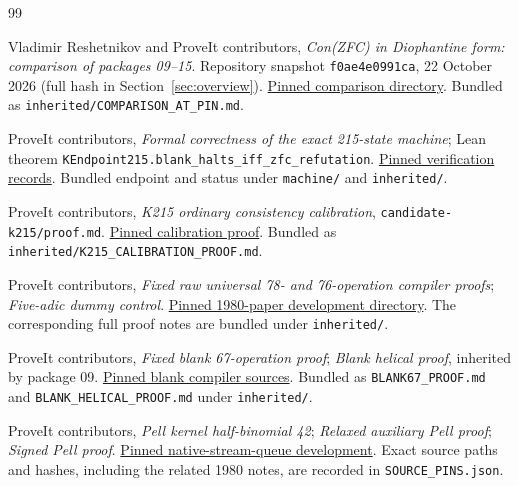 \begin{thebibliography}{99}

Vladimir Reshetnikov and ProveIt contributors,
\emph{Con(ZFC) in Diophantine form: comparison of packages 09--15}.
Repository snapshot \texttt{f0ae4e0991ca}, 22 October 2026
(full hash in Section~\ref{sec:overview}).
\href{https://github.com/VladimirReshetnikov/ProveIt/tree/f0ae4e0991ca44a7bb4e5671d42e33d775e48035/SetTheory/Cardinals/docs/reports/hilbert-tenth-problem/con-zfc-diophantine-forms}{Pinned comparison directory}.
Bundled as \texttt{inherited/COMPARISON\_AT\_PIN.md}.

ProveIt contributors, \emph{Formal correctness of the exact 215-state
machine}; Lean theorem
\texttt{KEndpoint215.blank\_halts\_iff\_zfc\_refutation}.
\href{https://github.com/VladimirReshetnikov/ProveIt/tree/f0ae4e0991ca44a7bb4e5671d42e33d775e48035/Computability/BusyBeaver/Research/ZFC/k225-formal/verification/k215}{Pinned verification records}.
Bundled endpoint and status under \texttt{machine/} and \texttt{inherited/}.

ProveIt contributors, \emph{K215 ordinary consistency calibration},
\texttt{candidate-k215/proof.md}.
\href{https://github.com/VladimirReshetnikov/ProveIt/blob/f0ae4e0991ca44a7bb4e5671d42e33d775e48035/Computability/BusyBeaver/Research/ZFC/candidate-k215/proof.md}{Pinned calibration proof}.
Bundled as \texttt{inherited/K215\_CALIBRATION\_PROOF.md}.

ProveIt contributors, \emph{Fixed raw universal 78- and 76-operation
compiler proofs}; \emph{Five-adic dummy control}.
\href{https://github.com/VladimirReshetnikov/ProveIt/tree/f0ae4e0991ca44a7bb4e5671d42e33d775e48035/Computability/HilbertTenthProblem/Papers/1980}{Pinned 1980-paper development directory}.
The corresponding full proof notes are bundled under \texttt{inherited/}.

ProveIt contributors, \emph{Fixed blank 67-operation proof};
\emph{Blank helical proof}, inherited by package 09.
\href{https://github.com/VladimirReshetnikov/ProveIt/tree/f0ae4e0991ca44a7bb4e5671d42e33d775e48035/SetTheory/Cardinals/docs/reports/hilbert-tenth-problem/con-zfc-diophantine-forms/09-combined13/upstream/compiler}{Pinned blank compiler sources}.
Bundled as \texttt{BLANK67\_PROOF.md} and
\texttt{BLANK\_HELICAL\_PROOF.md} under \texttt{inherited/}.

ProveIt contributors, \emph{Pell kernel half-binomial 42};
\emph{Relaxed auxiliary Pell proof}; \emph{Signed Pell proof}.
\href{https://github.com/VladimirReshetnikov/ProveIt/tree/f0ae4e0991ca44a7bb4e5671d42e33d775e48035/Computability/HilbertTenthProblem/Papers/research-wip/native-stream-queue}{Pinned native-stream-queue development}.
Exact source paths and hashes, including the related 1980 notes, are
recorded in \texttt{SOURCE\_PINS.json}.


\end{thebibliography}
